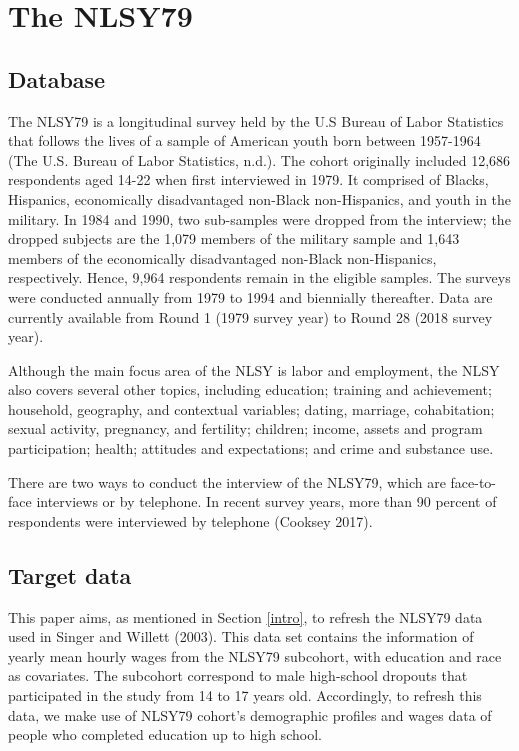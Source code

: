 \documentclass{article}
\begin{document}
\hypertarget{database}{%
\section{The NLSY79}\label{database}}

\hypertarget{database-1}{%
\subsection{Database}\label{database-1}}

The NLSY79 is a longitudinal survey held by the U.S Bureau of Labor Statistics that follows the lives of a sample of American youth born between 1957-1964 (The U.S. Bureau of Labor Statistics, n.d.). The cohort originally included 12,686 respondents aged 14-22 when first interviewed in 1979. It comprised of Blacks, Hispanics, economically disadvantaged non-Black non-Hispanics, and youth in the military. In 1984 and 1990, two sub-samples were dropped from the interview; the dropped subjects are the 1,079 members of the military sample and 1,643 members of the economically disadvantaged non-Black non-Hispanics, respectively. Hence, 9,964 respondents remain in the eligible samples. The surveys were conducted annually from 1979 to 1994 and biennially thereafter. Data are currently available from Round 1 (1979 survey year) to Round 28 (2018 survey year).

Although the main focus area of the NLSY is labor and employment, the NLSY also covers several other topics, including education; training and achievement; household, geography, and contextual variables; dating, marriage, cohabitation; sexual activity, pregnancy, and fertility; children; income, assets and program participation; health; attitudes and expectations; and crime and substance use.

There are two ways to conduct the interview of the NLSY79, which are face-to-face interviews or by telephone. In recent survey years, more than 90 percent of respondents were interviewed by telephone (Cooksey 2017).

\hypertarget{target}{%
\subsection{Target data}\label{target}}

This paper aims, as mentioned in Section \ref{intro}, to refresh the NLSY79 data used in Singer and Willett (2003). This data set contains the information of yearly mean hourly wages from the NLSY79 subcohort, with education and race as covariates. The subcohort correspond to male high-school dropouts that participated in the study from 14 to 17 years old. Accordingly, to refresh this data, we make use of NLSY79 cohort's demographic profiles and wages data of people who completed education up to high school.
\end{document}
